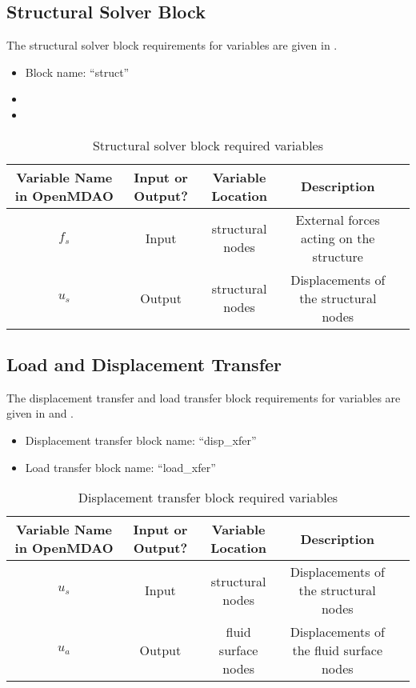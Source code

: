 \documentclass{article}
\begin{document}
\FloatBarrier
\subsection{Structural Solver Block}

The structural solver block requirements for variables are given in .

\begin{itemize}
\item Block name: ``struct''
\end{itemize}

\begin{itemize}
\item {}
\item {}
\end{itemize}


\begin{table}[H]
  \centering
  \caption{Structural solver block required variables}
  \label{tab:struct_vars}
  \begin{tabular}{c|c|c|c|c}
    Variable Name in OpenMDAO & Input or Output? & Variable Location   & Description \\
    \midrule
    $f_s$                     & Input            & structural nodes & External forces acting on the structure \\
    $u_s$                     & Output           & structural nodes & Displacements of the structural nodes \\
  \end{tabular}
\end{table}


\FloatBarrier
\subsection{Load and Displacement Transfer}

The displacement transfer and load transfer block requirements for variables are given in  and .

\begin{itemize}
\item Displacement transfer block name: ``disp\_xfer''
\item Load transfer block name: ``load\_xfer''
\end{itemize}

\begin{table}[H]
  \centering
  \caption{Displacement transfer block required variables}
  \label{tab:disp_xfer_vars}
  \begin{tabular}{c|c|c|c|c}
    Variable Name in OpenMDAO & Input or Output? & Variable Location   & Description \\
    \midrule
    $u_s$                     & Input            & structural nodes    & Displacements of the structural nodes \\
    $u_a$                     & Output           & fluid surface nodes & Displacements of the fluid surface nodes \\
  \end{tabular}
\end{table}
\end{document}
